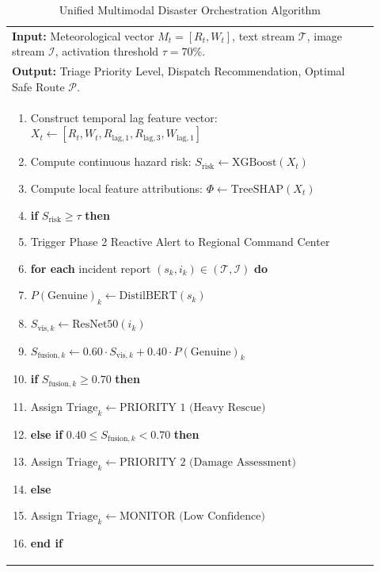 \documentclass{article}
\begin{document}
\begin{table}[H]
\centering
\caption{Unified Multimodal Disaster Orchestration Algorithm}
\label{alg:orchestration}
\begin{tabular}{p{0.92\linewidth}}
\toprule
\textbf{Input:} Meteorological vector $M_t = [R_t, W_t]$, text stream $\mathcal{T}$, image stream $\mathcal{I}$, activation threshold $\tau = 70\%$.\\
\textbf{Output:} Triage Priority Level, Dispatch Recommendation, Optimal Safe Route $\mathcal{P}$.\\
\midrule
\begin{enumerate}[label=\arabic*., topsep=2pt, itemsep=1pt]
    \item Construct temporal lag feature vector: $X_t \leftarrow [R_t, W_t, R_{\text{lag}, 1}, R_{\text{lag}, 3}, W_{\text{lag}, 1}]$
    \item Compute continuous hazard risk: $S_{\text{risk}} \leftarrow \text{XGBoost}(X_t)$
    \item Compute local feature attributions: $\Phi \leftarrow \text{TreeSHAP}(X_t)$
    \item \textbf{if} $S_{\text{risk}} \ge \tau$ \textbf{then}
    \item \quad Trigger Phase 2 Reactive Alert to Regional Command Center
    \item \quad \textbf{for each} incident report $(s_k, i_k) \in (\mathcal{T}, \mathcal{I})$ \textbf{do}
    \item \qquad $P(\text{Genuine})_k \leftarrow \text{DistilBERT}(s_k)$
    \item \qquad $S_{\text{vis}, k} \leftarrow \text{ResNet50}(i_k)$
    \item \qquad $S_{\text{fusion}, k} \leftarrow 0.60 \cdot S_{\text{vis}, k} + 0.40 \cdot P(\text{Genuine})_k$
    \item \qquad \textbf{if} $S_{\text{fusion}, k} \ge 0.70$ \textbf{then}
    \item \qquad \quad Assign $\text{Triage}_k \leftarrow \text{PRIORITY 1 (Heavy Rescue)}$
    \item \qquad \textbf{else if} $0.40 \le S_{\text{fusion}, k} < 0.70$ \textbf{then}
    \item \qquad \quad Assign $\text{Triage}_k \leftarrow \text{PRIORITY 2 (Damage Assessment)}$
    \item \qquad \textbf{else}
    \item \qquad \quad Assign $\text{Triage}_k \leftarrow \text{MONITOR (Low Confidence)}$
    \item \qquad \textbf{end if}

\end{enumerate}
\end{tabular}
\end{table}
\end{document}
